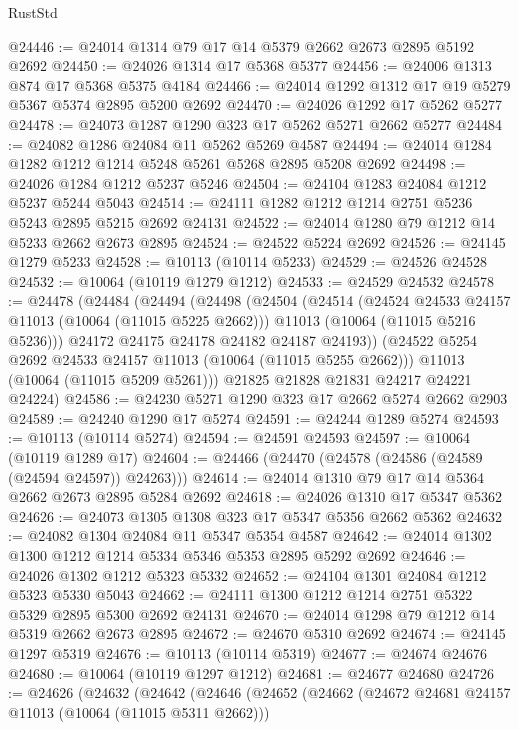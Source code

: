 \begin{lexlean}{RustStd}
\begin{coremodule}
@24446 := @24014 @1314 @79 @17 @14 @5379 @2662 @2673 @2895 @5192 @2692
@24450 := @24026 @1314 @17 @5368 @5377
@24456 := @24006 @1313 @874 @17 @5368 @5375 @4184
@24466 := @24014 @1292 @1312 @17 @19 @5279 @5367 @5374 @2895 @5200 @2692
@24470 := @24026 @1292 @17 @5262 @5277
@24478 := @24073 @1287 @1290 @323 @17 @5262 @5271 @2662 @5277
@24484 := @24082 @1286 @24084 @11 @5262 @5269 @4587
@24494 := @24014 @1284 @1282 @1212 @1214 @5248 @5261 @5268 @2895 @5208 @2692
@24498 := @24026 @1284 @1212 @5237 @5246
@24504 := @24104 @1283 @24084 @1212 @5237 @5244 @5043
@24514 := @24111 @1282 @1212 @1214 @2751 @5236 @5243 @2895 @5215 @2692 @24131
@24522 := @24014 @1280 @79 @1212 @14 @5233 @2662 @2673 @2895
@24524 := @24522 @5224 @2692
@24526 := @24145 @1279 @5233
@24528 := @10113 (@10114 @5233)
@24529 := @24526 @24528
@24532 := @10064 (@10119 @1279 @1212)
@24533 := @24529 @24532
@24578 := @24478
    (@24484
      (@24494
        (@24498
          (@24504
            (@24514
              (@24524 @24533 @24157 @11013 (@10064 (@11015 @5225 @2662)))
              @11013
              (@10064 (@11015 @5216 @5236)))
            @24172
            @24175
            @24178
            @24182
            @24187
            @24193))
        (@24522 @5254 @2692 @24533 @24157 @11013 (@10064 (@11015 @5255 @2662)))
        @11013
        (@10064 (@11015 @5209 @5261)))
      @21825
      @21828
      @21831
      @24217
      @24221
      @24224)
@24586 := @24230 @5271 @1290 @323 @17 @2662 @5274 @2662 @2903
@24589 := @24240 @1290 @17 @5274
@24591 := @24244 @1289 @5274
@24593 := @10113 (@10114 @5274)
@24594 := @24591 @24593
@24597 := @10064 (@10119 @1289 @17)
@24604 := @24466 (@24470 (@24578 (@24586 (@24589 (@24594 @24597)) @24263)))
@24614 := @24014 @1310 @79 @17 @14 @5364 @2662 @2673 @2895 @5284 @2692
@24618 := @24026 @1310 @17 @5347 @5362
@24626 := @24073 @1305 @1308 @323 @17 @5347 @5356 @2662 @5362
@24632 := @24082 @1304 @24084 @11 @5347 @5354 @4587
@24642 := @24014 @1302 @1300 @1212 @1214 @5334 @5346 @5353 @2895 @5292 @2692
@24646 := @24026 @1302 @1212 @5323 @5332
@24652 := @24104 @1301 @24084 @1212 @5323 @5330 @5043
@24662 := @24111 @1300 @1212 @1214 @2751 @5322 @5329 @2895 @5300 @2692 @24131
@24670 := @24014 @1298 @79 @1212 @14 @5319 @2662 @2673 @2895
@24672 := @24670 @5310 @2692
@24674 := @24145 @1297 @5319
@24676 := @10113 (@10114 @5319)
@24677 := @24674 @24676
@24680 := @10064 (@10119 @1297 @1212)
@24681 := @24677 @24680
@24726 := @24626
    (@24632
      (@24642
        (@24646
          (@24652
            (@24662
              (@24672 @24681 @24157 @11013 (@10064 (@11015 @5311 @2662)))

\end{coremodule}
\end{lexlean}

